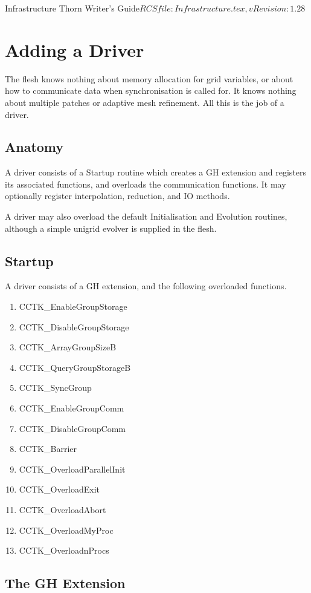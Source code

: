 \begin{cactuspart}{4}{Infrastructure Thorn Writer's Guide}{$RCSfile: Infrastructure.tex,v $}{$Revision: 1.28 $}
\chapter{Adding a Driver}

The flesh knows nothing about memory allocation for grid variables, or about how
to communicate data when synchronisation is called for.  It knows nothing about 
multiple patches or adaptive mesh refinement.  All this is the job of a driver.

\section{Anatomy}

A driver consists of a Startup routine which creates a GH extension and 
registers its associated functions, and overloads the communication functions.
It may optionally register interpolation, reduction, and IO methods.

A driver may also overload the default Initialisation and Evolution routines,
although a simple unigrid evolver is supplied in the flesh.

\section{Startup}

A driver consists of a GH extension, and the following overloaded
functions.

\begin{enumerate}
\item{} CCTK\_EnableGroupStorage
\item{} CCTK\_DisableGroupStorage
\item{} CCTK\_ArrayGroupSizeB
\item{} CCTK\_QueryGroupStorageB
\item{} CCTK\_SyncGroup
\item{} CCTK\_EnableGroupComm
\item{} CCTK\_DisableGroupComm
\item{} CCTK\_Barrier
\item{} CCTK\_OverloadParallelInit
\item{} CCTK\_OverloadExit
\item{} CCTK\_OverloadAbort
\item{} CCTK\_OverloadMyProc
\item{} CCTK\_OverloadnProcs
\end{enumerate}

\section{The GH Extension}


\end{cactuspart}
